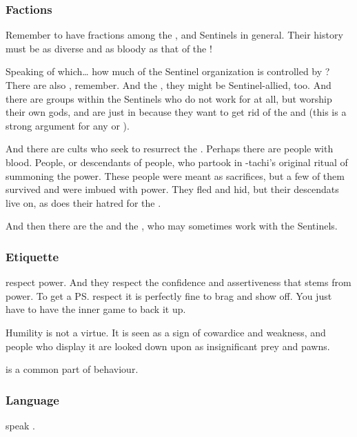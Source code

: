 \subsubsection{Factions}
Remember to have fractions among the \dragons{}, and Sentinels in general. 
Their history must be as diverse and as bloody as that of the \resphain!

Speaking of which\ldots{} how much of the Sentinel organization is controlled by \dragons? There are also \rachyth, remember. And the \Baelzerach, they might be Sentinel-allied, too. And there are groups within the Sentinels who do not work for \dragons{} at all, but worship their own gods, and are just in because they want to get rid of the \banes{} and \resphain{} (this is a strong argument for any \scatha{} or \rachyth). 

And there are cults who seek to resurrect the \xzaishanns. Perhaps there are people with \xzaishannic{} blood. People, or descendants of people, who partook in \Tiamat-tachi's original ritual of summoning the \xzaishannic{} power. These people were meant as sacrifices, but a few of them survived and were imbued with \xzaishannic{} power. They fled and hid, but their descendats live on, as does their hatred for the \draecchonosh. 

And then there are the \ophidians{} and the \nagae{}, who may sometimes work with the Sentinels. 









\subsubsection{Etiquette}
\Dragons{} respect power. 
And they respect the confidence and assertiveness that stems from power. 
To get a \ps{\dragon}{} respect it is perfectly fine to brag and show off. 
You just have to have the inner game to back it up. 

Humility is not a virtue. 
It is seen as a sign of cowardice and weakness, and people who display it are looked down upon as insignificant prey and pawns. 

 is a common part of \Draconic{} behaviour. 





\subsubsection{Language}
\Dragons speak . 

